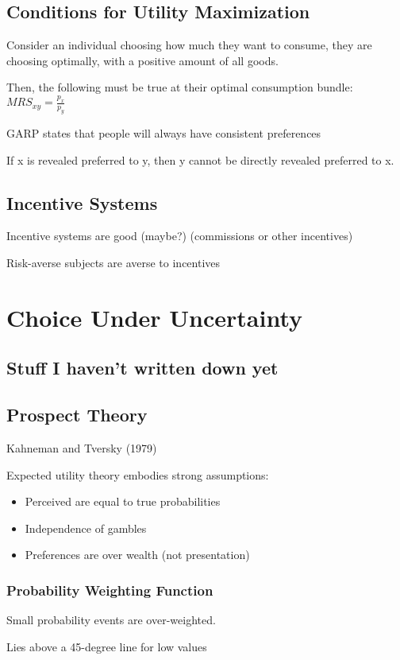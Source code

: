 \documentclass[12pt]{article}
\begin{document}
\subsection{Conditions for Utility Maximization}

Consider an individual choosing how much they want to consume, they are choosing optimally, with a positive amount of all goods.

Then, the following must be true at their optimal consumption bundle: $MRS_{xy} = \frac{p_{x}}{p_{y}}$

GARP states that people will always have consistent preferences

If x is revealed preferred to y, then y cannot be directly revealed preferred to x.

\subsection{Incentive Systems}

Incentive systems are good (maybe?) (commissions or other incentives)

Risk-averse subjects are averse to incentives

\section{Choice Under Uncertainty}

\subsection{Stuff I haven't written down yet}

\subsection{Prospect Theory}

Kahneman and Tversky (1979)

Expected utility theory embodies strong assumptions:
\begin{itemize}
    \item Perceived are equal to true probabilities
    \item Independence of gambles
    \item Preferences are over wealth (not presentation)
\end{itemize}

\subsubsection{Probability Weighting Function}

Small probability events are over-weighted.

Lies above a 45-degree line for low values
\end{document}
